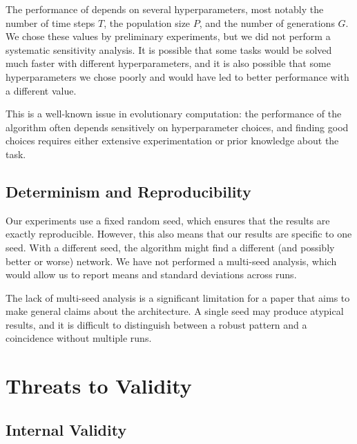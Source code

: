 The performance of \modnet{} depends on several hyperparameters, most
notably the number of time steps $T$, the population size $P$, and
the number of generations $G$. We chose these values by preliminary
experiments, but we did not perform a systematic sensitivity analysis.
It is possible that some tasks would be solved much faster with
different hyperparameters, and it is also possible that some
hyperparameters we chose poorly and would have led to better
performance with a different value.

This is a well-known issue in evolutionary computation: the
performance of the algorithm often depends sensitively on
hyperparameter choices, and finding good choices requires either
extensive experimentation or prior knowledge about the task.

\subsection{Determinism and Reproducibility}
\label{sec:limitation-repro}

Our experiments use a fixed random seed, which ensures that the
results are exactly reproducible. However, this also means that our
results are specific to one seed. With a different seed, the
algorithm might find a different (and possibly better or worse)
network. We have not performed a multi-seed analysis, which would
allow us to report means and standard deviations across runs.

The lack of multi-seed analysis is a significant limitation for a
paper that aims to make general claims about the architecture. A
single seed may produce atypical results, and it is difficult to
distinguish between a robust pattern and a coincidence without
multiple runs.

\section{Threats to Validity}
\label{sec:threats}

\subsection{Internal Validity}
\label{sec:threats-internal}

